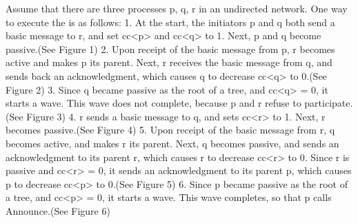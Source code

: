 \documentclass[letterpaper,10pt,english]{sphinxmanual}
\begin{document}
\sphinxAtStartPar
Assume that there are three processes p, q, r in an undirected network. One way to execute the {\hyperref[\detokenize{docs/ShavitFranchezAlg/algorithm:shavitfranchesterminationdetectionalgorithm}]{}} is as follows:
1. At the start, the initiators p and q both send a basic message to r, and set cc\textless{}p\textgreater{} and cc\textless{}q\textgreater{} to 1. Next, p and q become passive.(See Figure 1)
2. Upon receipt of the basic message from p, r becomes active and makes p its parent. Next, r receives the basic message from q, and sends back an acknowledgment, which causes q to decrease cc\textless{}q\textgreater{} to 0.(See Figure 2)
3. Since q became passive as the root of a tree, and cc\textless{}q\textgreater{} = 0, it starts a wave. This wave does not complete, because p and r refuse to participate.(See Figure 3)
4. r sends a basic message to q, and sets cc\textless{}r\textgreater{} to 1. Next, r becomes passive.(See Figure 4)
5. Upon receipt of the basic message from r, q becomes active, and makes r its parent. Next, q becomes passive, and sends an acknowledgment to its parent r, which causes r to decrease cc\textless{}r\textgreater{} to 0. Since r is passive and cc\textless{}r\textgreater{} = 0, it sends an acknowledgment to its parent p, which causes p to decrease cc\textless{}p\textgreater{} to 0.(See Figure 5)
6. Since p became passive as the root of a tree, and cc\textless{}p\textgreater{} = 0, it starts a wave. This wave completes, so that p calls Announce.(See Figure 6)
\end{document}
